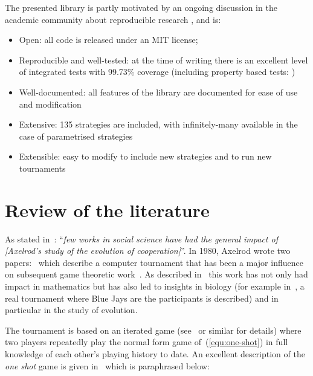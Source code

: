 \documentclass{jors}
\begin{document}
The presented library is partly motivated by an ongoing discussion in the
academic community about reproducible research \cite{Crick2014a, Hong2015a,
Prlic2012, Sandve2013}, and is:

\begin{itemize}[noitemsep,topsep=0pt]
    \item Open: all code is released under an MIT license;
    \item Reproducible and well-tested: at the time of writing there is an excellent level of
        integrated tests with 99.73\% coverage (including property based tests:
        \cite{Hypothesis3.0.3})
    \item Well-documented: all features of the library are documented for ease of
        use and modification
    \item Extensive: 135 strategies are included, with infinitely-many
        available in the case of parametrised strategies
    \item Extensible: easy to modify to include new strategies and to run new
        tournaments
\end{itemize}

\section*{Review of the literature}\label{sec:review}

As stated in~\cite{Bendor1991}: ``\textit{few works in social science have had
the general impact of [Axelrod's study of the evolution of cooperation]}''.  In
1980, Axelrod wrote two papers:~\cite{Axelrod1980a,Axelrod1980b} which
describe a computer tournament that has been a major influence on
subsequent game theoretic work~\cite{Banks1990, Bendor1991, Boyd1987, Chellapilla1999,
DavidB1993, Doebeli2005, Ellison1994, Gotts2003, Hilbe2013, Isaac2008,
Kraines1989, Lee2015, Lorberbaum1994, Milgrom1982, Molander1985, Murnighan2015,
Press2012, Stephens2002, Stewart2012}. As described in~\cite{Bendor1991} this
work has not only had impact in mathematics but has also led to insights in
biology (for example in~\cite{Stephens2002}, a real tournament where Blue Jays
are the participants is described) and in particular in the study of evolution.

The tournament is based on an iterated game (see~\cite{Maschler2013} or similar
for details) where two players repeatedly play the normal form game
of~(\ref{equ:one-shot}) in full knowledge of each other's playing history to
date.  An excellent description of the \textit{one shot} game is given
in~\cite{Gotts2003} which is paraphrased below:
\end{document}

